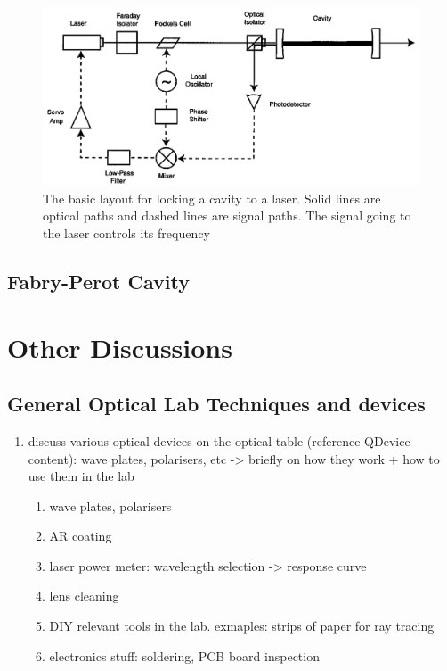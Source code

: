 \documentclass[11pt,A4Paper]{article}
\begin{document}
\begin{figure}[H]
    \centering
    \includegraphics[width=.8\textwidth]{PDHlayout.png}
    \caption{The basic layout for locking a cavity to a laser. Solid lines are optical paths and dashed lines are signal paths. The signal going to the laser controls its frequency \cite{PDHintro}}
    \label{fig:PDHlayout}
\end{figure}

\subsection{Fabry-Perot Cavity}

\section{Other Discussions}
\subsection{General Optical Lab Techniques and devices}
\begin{enumerate}
    \item discuss various optical devices on the optical table (reference QDevice content): wave plates, polarisers, etc -> briefly on how they work + how to use them in the lab 
    \begin{enumerate}
        \item wave plates, polarisers
        \item AR coating
        \item laser power meter: wavelength selection -> response curve
        \item lens cleaning
        \item DIY relevant tools in the lab. exmaples: strips of paper for ray tracing
        \item electronics stuff: soldering, PCB board inspection
        
    \end{enumerate}
\end{enumerate}
\end{document}
